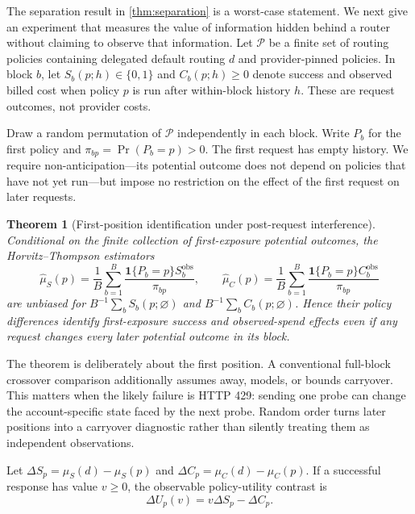 \documentclass[11pt]{article}
\newtheorem{theorem}{Theorem}
\theoremstyle{definition}
\begin{document}
The separation result in \cref{thm:separation} is a worst-case statement. We
next give an experiment that measures the value of information hidden behind a
router without claiming to observe that information. Let $\mathcal P$ be a
finite set of routing policies containing delegated default routing $d$ and
provider-pinned policies. In block $b$, let $S_b(p;h)\in\{0,1\}$ and
$C_b(p;h)\geq0$ denote success and observed billed cost when policy $p$ is run
after within-block history $h$. These are request outcomes, not provider costs.

Draw a random permutation of $\mathcal P$ independently in each block. Write
$P_b$ for the first policy and $\pi_{bp}=\Pr(P_b=p)>0$. The first request has
empty history. We require non-anticipation---its potential outcome does not
depend on policies that have not yet run---but impose no restriction on the
effect of the first request on later requests.

\begin{theorem}[First-position identification under post-request interference]
\label{thm:firstposition}
Conditional on the finite collection of first-exposure potential outcomes, the
Horvitz--Thompson estimators
\[
 \widehat\mu_S(p)=\frac1B\sum_{b=1}^B
 \frac{\mathbf 1\{P_b=p\}S_b^{\mathrm{obs}}}{\pi_{bp}},\qquad
 \widehat\mu_C(p)=\frac1B\sum_{b=1}^B
 \frac{\mathbf 1\{P_b=p\}C_b^{\mathrm{obs}}}{\pi_{bp}}
\]
are unbiased for $B^{-1}\sum_b S_b(p;\varnothing)$ and
$B^{-1}\sum_b C_b(p;\varnothing)$. Hence their policy differences identify
first-exposure success and observed-spend effects even if any request changes
every later potential outcome in its block.
\end{theorem}

The theorem is deliberately about the first position. A conventional
full-block crossover comparison additionally assumes away, models, or bounds
carryover. This matters when the likely failure is HTTP 429: sending one probe
can change the account-specific state faced by the next probe. Random order
turns later positions into a carryover diagnostic rather than silently treating
them as independent observations.

Let $\Delta S_p=\mu_S(d)-\mu_S(p)$ and
$\Delta C_p=\mu_C(d)-\mu_C(p)$. If a successful response has value $v\geq0$,
the observable policy-utility contrast is
\begin{equation}
\label{eq:valuefrontier}
 \Delta U_p(v)=v\Delta S_p-\Delta C_p.
\end{equation}
\end{document}
